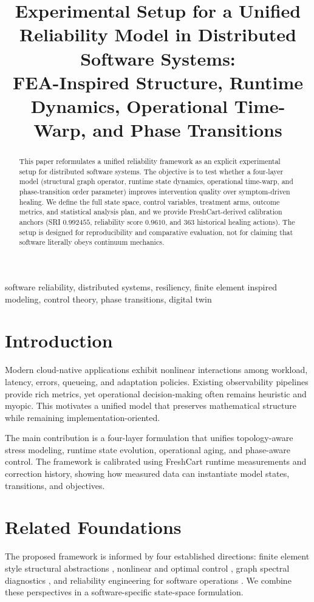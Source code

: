 \documentclass[conference]{IEEEtran}
\title{Experimental Setup for a Unified Reliability Model in Distributed Software Systems:\\
FEA-Inspired Structure, Runtime Dynamics, Operational Time-Warp, and Phase Transitions}
\author{\IEEEauthorblockN{Anand Sunder}
\IEEEauthorblockA{Manuscript Prepared for Review}}
\begin{document}
\maketitle

\begin{abstract}
This paper reformulates a unified reliability framework as an explicit experimental setup for distributed software systems. The objective is to test whether a four-layer model (structural graph operator, runtime state dynamics, operational time-warp, and phase-transition order parameter) improves intervention quality over symptom-driven healing. We define the full state space, control variables, treatment arms, outcome metrics, and statistical analysis plan, and we provide FreshCart-derived calibration anchors (SRI $0.992455$, reliability score $0.9610$, and $363$ historical healing actions). The setup is designed for reproducibility and comparative evaluation, not for claiming that software literally obeys continuum mechanics.
\end{abstract}

\begin{IEEEkeywords}
software reliability, distributed systems, resiliency, finite element inspired modeling, control theory, phase transitions, digital twin
\end{IEEEkeywords}

\section{Introduction}
Modern cloud-native applications exhibit nonlinear interactions among workload, latency, errors, queueing, and adaptation policies. Existing observability pipelines provide rich metrics, yet operational decision-making often remains heuristic and myopic. This motivates a unified model that preserves mathematical structure while remaining implementation-oriented.

The main contribution is a four-layer formulation that unifies topology-aware stress modeling, runtime state evolution, operational aging, and phase-aware control. The framework is calibrated using FreshCart runtime measurements and correction history, showing how measured data can instantiate model states, transitions, and objectives.

\section{Related Foundations}
The proposed framework is informed by four established directions: finite element style structural abstractions \cite{zienkiewicz2005fem}, nonlinear and optimal control \cite{khalil2002nonlinear,bertsekas1995dynamic}, graph spectral diagnostics \cite{chung1997spectral}, and reliability engineering for software operations \cite{google2016sre}. We combine these perspectives in a software-specific state-space formulation.
\end{document}
